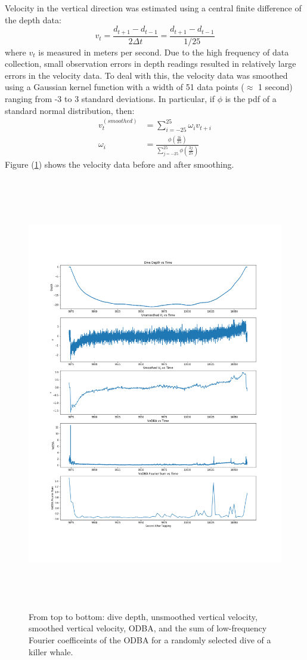 Velocity in the vertical direction was estimated using a central finite difference of the depth data:
%
$$v_t = \frac{d_{t+1} - d_{t-1}}{2\Delta t} = \frac{d_{t+1} - d_{t-1}}{1/25} $$
%
where $v_t$ is measured in meters per second. Due to the high frequency of data collection, small observation errors in depth readings resulted in relatively large errors in the velocity data. To deal with this, the velocity data was smoothed using a Gaussian kernel function with a width of 51 data points ($\approx$ 1 second) ranging from -3 to 3 standard deviations. In particular, if $\phi$ is the pdf of a standard normal distribution, then:
%
\begin{align*}
v^{(smoothed)}_t &= \sum_{i=-25}^{25} \omega_i v_{t+i} \\
\omega_i &= \frac{\phi\left(\frac{3i}{25}\right)}{\sum_{j=-25}^{25}\phi\left(\frac{3j}{25}\right)}
\end{align*}
%
Figure (\ref{fig:smoothing}) shows the velocity data before and after smoothing.

\begin{figure}[h!]
	\centering
	\includegraphics[height=7.5in]{../Plots/smoothed_v.png}
	\caption{From top to bottom: dive depth, unsmoothed vertical velocity, smoothed vertical velocity, ODBA, and the sum of low-frequency Fourier coefficeints of the ODBA for a randomly selected dive of a killer whale.}
	\label{fig:smoothing}
\end{figure}


